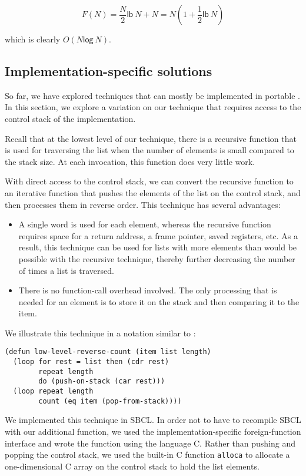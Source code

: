 \[ F(N) = \frac{N}{2}\mathsf{lb}~N + N = N(1 + \frac{1}{2}\mathsf{lb}~N)\]

which is clearly $O(N\mathsf{log}~N)$.


\subsection{Implementation-specific solutions}

So far, we have explored techniques that can mostly be implemented in
portable \commonlisp{}.  In this section, we explore a variation on
our technique that requires access to the control stack of the
implementation.

Recall that at the lowest level of our technique, there is a recursive
function that is used for traversing the list when the number of
elements is small compared to the stack size.  At each invocation,
this function does very little work.

With direct access to the control stack, we can convert the recursive
function to an iterative function that pushes the elements of the list
on the control stack, and then processes them in reverse order.  This
technique has several advantages:

\begin{itemize}
\item A single word is used for each element, whereas the recursive
  function requires space for a return address, a frame pointer,
  saved registers, etc.  As a result, this technique can be used for
  lists with more elements than would be possible with the recursive
  technique, thereby further decreasing the number of times a list is
  traversed.
\item There is no function-call overhead involved.  The only
  processing that is needed for an element is to store it on the stack
  and then comparing it to the item.
\end{itemize}

We illustrate this technique in a notation similar to \commonlisp{}:

{\small\begin{verbatim}
(defun low-level-reverse-count (item list length)
  (loop for rest = list then (cdr rest)
        repeat length
        do (push-on-stack (car rest)))
  (loop repeat length
        count (eq item (pop-from-stack))))
\end{verbatim}}

We implemented this technique in SBCL.  In order not to have to
recompile SBCL with our additional function, we used the
implementation-specific foreign-function interface and wrote the
function using the language C.  Rather than pushing and popping the
control stack, we used the built-in C function \texttt{alloca} to
allocate a one-dimensional C array on the control stack to hold the
list elements.

